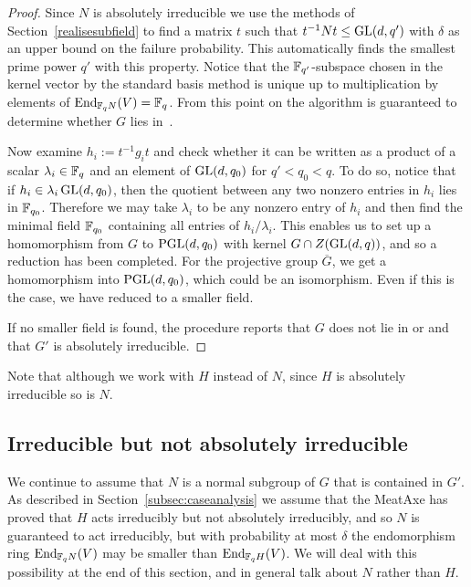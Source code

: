 \begin{proof}
Since $N$ is absolutely irreducible we use the methods of
Section~\ref{realisesubfield} to find a matrix $t$ such that $t^{-1}Nt
\leq \GL(d, q')$
with $\delta$ as an upper bound on the failure probability.
This automatically finds the smallest prime power $q'$ with this       
property. Notice that the $\mathbb{F}_{q'}$-subspace chosen in the kernel 
vector by the standard basis method is unique up to multiplication 
by elements of $\End_{\F_q N}(V) = \F_q$.   From this point on 
the algorithm is guaranteed to determine   
whether $G$ lies in~.

Now examine $h_i:= t^{-1}g_it$ and check whether it can be written as a
product of a scalar $\lambda_i \in \mathbb{F}_{q}$ and an element of $\GL(d,
q_0)$ for $q' < q_0 < q$. 
To do so, notice that if $h_i \in \lambda_i \GL(d,q_0)$,
then the quotient between any two
nonzero entries in $h_i$ lies in $\mathbb{F}_{q_0}$. 
Therefore we may take
$\lambda_i$ to be any nonzero entry of $h_i$ and then find the
minimal field $\mathbb{F}_{q_0}$ containing all entries of $h_i / \lambda_i$. 
This enables us to set up a homomorphism from $G$ to $\PGL(d, q_0)$
with kernel $G \cap Z(\GL(d, q))$, and so a reduction has been
completed. 
For the projective group $\overline{G}$,
we get a homomorphism into $\PGL(d,q_0)$, which could be
an isomorphism. Even if this is the case, we have reduced to a smaller field. 

If no smaller field is found, the procedure reports that
 $G$ does not lie in  or  and that $G'$ is absolutely irreducible.
\end{proof}

Note that although we work with $H$ instead of $N$, 
since $H$ is absolutely irreducible so is $N$. 


\subsection{Irreducible but not absolutely irreducible} \label{subsec:semilin}

We continue to assume that $N$ is a normal subgroup of $G$ that is
contained in $G'$. As described in
Section~\ref{subsec:caseanalysis} we assume that the MeatAxe has proved
that $H$ acts irreducibly but not absolutely
irreducibly, and so $N$ is guaranteed to act irreducibly, but with 
probability at most $\delta$ the endomorphism ring $\End_{\F_q N}(V)$ may 
be smaller than $\End_{\F_q H}(V)$. 
We will deal with this possibility at the end of this section, 
and in general talk about $N$ rather than $H$.


